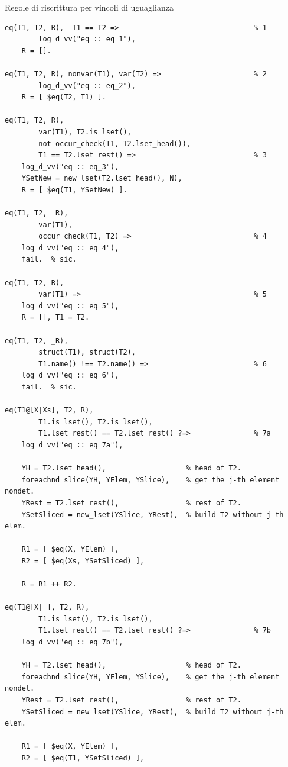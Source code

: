 \documentclass[12pt,a4paper,openright]{book} %
\begin{document}
\begin{algorithm}[H]
	\caption{Regole di riscrittura per vincoli di uguaglianza}
	\label{alg:eq_constraints}
\end{algorithm}
\begin{verbatim}
eq(T1, T2, R),  T1 == T2 =>                                % 1
        log_d_vv("eq :: eq_1"),
    R = [].

eq(T1, T2, R), nonvar(T1), var(T2) =>                      % 2
        log_d_vv("eq :: eq_2"),
    R = [ $eq(T2, T1) ].

eq(T1, T2, R),
        var(T1), T2.is_lset(),
        not occur_check(T1, T2.lset_head()),
        T1 == T2.lset_rest() =>                            % 3
   	log_d_vv("eq :: eq_3"),
    YSetNew = new_lset(T2.lset_head(),_N),
    R = [ $eq(T1, YSetNew) ].

eq(T1, T2, _R),
        var(T1),
        occur_check(T1, T2) =>                             % 4
    log_d_vv("eq :: eq_4"),
    fail.  % sic.

eq(T1, T2, R),
        var(T1) =>                                         % 5
    log_d_vv("eq :: eq_5"),
    R = [], T1 = T2.

eq(T1, T2, _R),
        struct(T1), struct(T2),
        T1.name() !== T2.name() =>                         % 6
    log_d_vv("eq :: eq_6"),
    fail.  % sic.

eq(T1@[X|Xs], T2, R),
        T1.is_lset(), T2.is_lset(),
        T1.lset_rest() == T2.lset_rest() ?=>               % 7a
    log_d_vv("eq :: eq_7a"),

    YH = T2.lset_head(),                   % head of T2.
    foreachnd_slice(YH, YElem, YSlice),    % get the j-th element nondet.
    YRest = T2.lset_rest(),                % rest of T2.
    YSetSliced = new_lset(YSlice, YRest),  % build T2 without j-th elem.

    R1 = [ $eq(X, YElem) ],
    R2 = [ $eq(Xs, YSetSliced) ],

    R = R1 ++ R2.

eq(T1@[X|_], T2, R),
        T1.is_lset(), T2.is_lset(),
        T1.lset_rest() == T2.lset_rest() ?=>               % 7b
    log_d_vv("eq :: eq_7b"),

    YH = T2.lset_head(),                   % head of T2.
    foreachnd_slice(YH, YElem, YSlice),    % get the j-th element nondet.
    YRest = T2.lset_rest(),                % rest of T2.
    YSetSliced = new_lset(YSlice, YRest),  % build T2 without j-th elem.

    R1 = [ $eq(X, YElem) ],
    R2 = [ $eq(T1, YSetSliced) ],


\end{verbatim}
\end{document}
